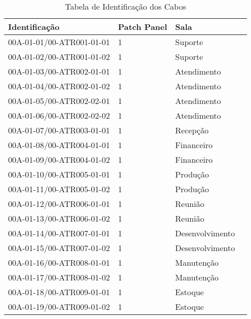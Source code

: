 
\begin{table}[H]
\centering
\caption{Tabela de Identificação dos Cabos}
\label{tabela_identificacao_cabos}
\begin{tabular}{|l|l|l|l|}
	\hline
	
	Identificação             & Patch Panel & Sala            \\ \hline
	00A-01-01/00-ATR001-01-01 & 1           & Suporte         \\ \hline
	00A-01-02/00-ATR001-01-02 & 1           & Suporte         \\ \hline
	00A-01-03/00-ATR002-01-01 & 1           & Atendimento     \\ \hline
	00A-01-04/00-ATR002-01-02 & 1           & Atendimento     \\ \hline
	00A-01-05/00-ATR002-02-01 & 1           & Atendimento     \\ \hline
	00A-01-06/00-ATR002-02-02 & 1           & Atendimento     \\ \hline
	00A-01-07/00-ATR003-01-01 & 1           & Recepção        \\ \hline
	00A-01-08/00-ATR004-01-01 & 1           & Financeiro      \\ \hline
	00A-01-09/00-ATR004-01-02 & 1           & Financeiro      \\ \hline
	00A-01-10/00-ATR005-01-01 & 1           & Produção        \\ \hline
	00A-01-11/00-ATR005-01-02 & 1           & Produção        \\ \hline
	00A-01-12/00-ATR006-01-01 & 1           & Reunião         \\ \hline
	00A-01-13/00-ATR006-01-02 & 1           & Reunião         \\ \hline
	00A-01-14/00-ATR007-01-01 & 1           & Desenvolvimento \\ \hline
	00A-01-15/00-ATR007-01-02 & 1           & Desenvolvimento \\ \hline
	00A-01-16/00-ATR008-01-01 & 1           & Manutenção      \\ \hline
	00A-01-17/00-ATR008-01-02 & 1           & Manutenção      \\ \hline
	00A-01-18/00-ATR009-01-01 & 1           & Estoque         \\ \hline
	00A-01-19/00-ATR009-01-02 & 1           & Estoque         \\ \hline
\end{tabular}
\end{table}

